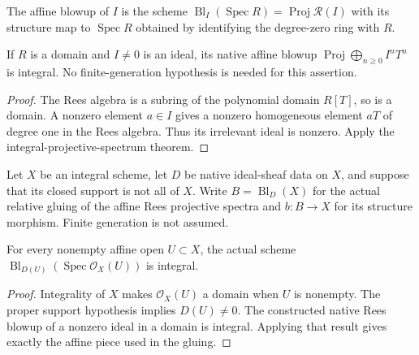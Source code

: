 \endgroup

\begingroup

\begin{definition}
\label{def:affine-blowup}
\leanok
The affine blowup of $I$ is the scheme
$\operatorname{Bl}_I(\operatorname{Spec}R)=\operatorname{Proj}\mathcal R(I)$ with its
structure map to $\operatorname{Spec}R$ obtained by identifying the degree-zero ring with $R$.
\end{definition}

\endgroup

\begingroup

\begin{corollary}
\label{cor:affine-blowup-integral}
\leanok
If $R$ is a domain and $I\ne0$ is an ideal, its native affine blowup
$\operatorname{Proj}\bigoplus_{n\ge0} I^nT^n$ is integral.
No finite-generation hypothesis is needed for this assertion.
\end{corollary}
\begin{proof}
The Rees algebra is a subring of the polynomial domain $R[T]$, so is a
domain. A nonzero element $a\in I$ gives a nonzero homogeneous element
$aT$ of degree one in the Rees algebra. Thus its irrelevant ideal is
nonzero. Apply the integral-projective-spectrum theorem.
\end{proof}
\endgroup

\begingroup

Let $X$ be an integral scheme, let $D$ be native ideal-sheaf
data on $X$, and suppose that its closed support is not all
of $X$. Write $B=\operatorname{Bl}_D(X)$ for the actual
relative gluing of the affine Rees projective spectra and
$b:B\to X$ for its structure morphism. Finite generation is
not assumed.

\begin{lemma}
\label{lem:global-blowup-integral-affine-pieces}
\leanok
For every nonempty affine open $U\subset X$, the actual
scheme $\operatorname{Bl}_{D(U)}(\operatorname{Spec}\mathcal O_X(U))$
is integral.
\end{lemma}
\begin{proof}
Integrality of $X$ makes $\mathcal O_X(U)$ a domain when
$U$ is nonempty. The proper support hypothesis implies
$D(U)\ne0$. The constructed native Rees blowup
of a nonzero ideal in a domain is integral. Applying that
result gives exactly the affine piece used in the gluing.
\end{proof}

